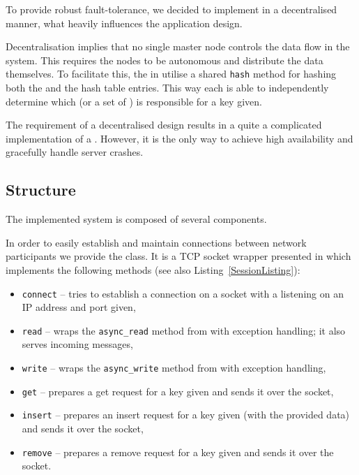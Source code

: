         To provide robust fault-tolerance, we decided to implement \DHTS in a decentralised manner, what heavily influences the application design.
    
        Decentralisation implies that no single master node controls the data flow in the system. This requires the nodes to be autonomous and distribute the data themselves.
        To facilitate this, the \Nodes in \DHTS utilise a shared \texttt{hash} method for hashing both the \Nodes and the hash table entries. This way each \Node is able to independently determine which \Node (or a set of \Nodes) is responsible for a key given.
        
        The requirement of a decentralised design results in a quite a complicated implementation of a \Node. However, it is the only way to achieve high availability and gracefully handle server crashes.

    \subsection{Structure}
        The implemented system is composed of several components.

        In order to easily establish and maintain connections between network participants we provide the \Session class. It is a TCP socket wrapper presented in which implements the following methods (see also Listing~\ref{SessionListing}):
        
        \begin{itemize}
            \item \texttt{connect} -- tries to establish a connection on a socket with a \Node listening on an IP address and port given,
            \item \texttt{read} -- wraps the \texttt{async\_read} method from \Asio with exception handling; it also serves incoming messages,
            \item \texttt{write} -- wraps the \texttt{async\_write} method from \Asio with exception handling,
            \item \texttt{get} -- prepares a get request for a key given and sends it over the socket,
            \item \texttt{insert} -- prepares an insert request for a key given (with the provided data) and sends it over the socket,
            \item \texttt{remove} -- prepares a remove request for a key given and sends it over the socket.
        \end{itemize}

